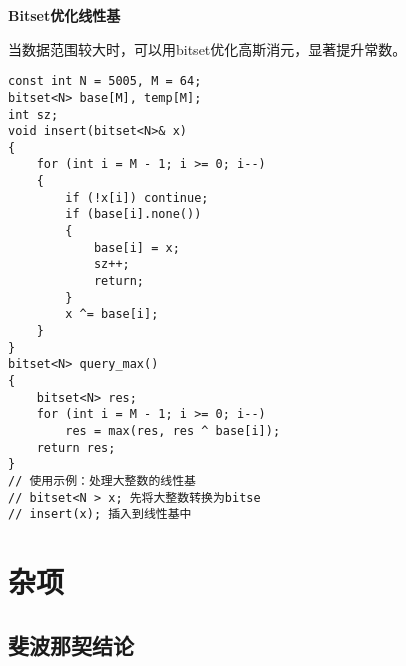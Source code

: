 \documentclass[a4paper, fontset=none]{ctexart}
\begin{document}
\textbf{Bitset优化线性基}

当数据范围较大时，可以用bitset优化高斯消元，显著提升常数。

\begin{verbatim}
const int N = 5005, M = 64;
bitset<N> base[M], temp[M];
int sz;
void insert(bitset<N>& x)
{
    for (int i = M - 1; i >= 0; i--)
    {
        if (!x[i]) continue;
        if (base[i].none())
        {
            base[i] = x;
            sz++;
            return;
        }
        x ^= base[i];
    }
}
bitset<N> query_max()
{
    bitset<N> res;
    for (int i = M - 1; i >= 0; i--)
        res = max(res, res ^ base[i]);
    return res;
}
// 使用示例：处理大整数的线性基
// bitset<N > x; 先将大整数转换为bitse
// insert(x); 插入到线性基中
\end{verbatim}

\section{杂项}
\subsection{斐波那契结论}
\end{document}
